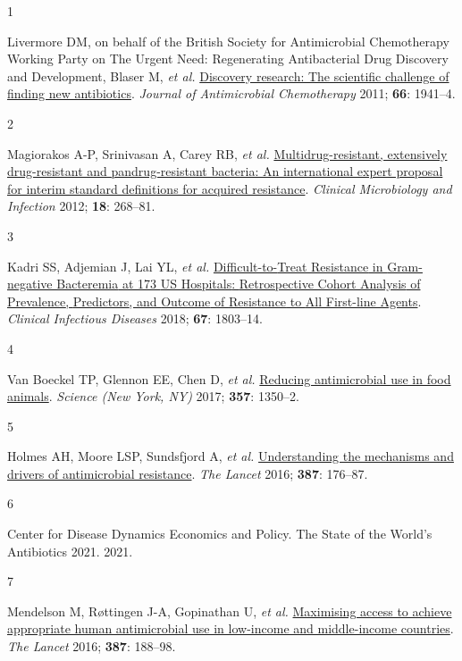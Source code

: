 \documentclass[
]{book}
\newlength{\cslhangindent}
\newlength{\csllabelwidth}
\newlength{\cslentryspacingunit} %
\newenvironment{CSLReferences}[2] %
 {%
  \setlength{\parindent}{0pt}
  \ifodd #1
  \let\oldpar\par
  \def\par{\hangindent=\cslhangindent\oldpar}
  \fi
  \setlength{\parskip}{#2\cslentryspacingunit}
 }%
 {}
\newcommand{\CSLLeftMargin}[1]{\parbox[t]{\csllabelwidth}{#1}}
\newcommand{\CSLRightInline}[1]{\parbox[t]{\linewidth - \csllabelwidth}{#1}\break}
\begin{document}
\hypertarget{refs}{}
\begin{CSLReferences}{0}{0}
\leavevmode{}%
\CSLLeftMargin{1 }
\CSLRightInline{Livermore DM, on behalf of the British Society for Antimicrobial Chemotherapy Working Party on The Urgent Need: Regenerating Antibacterial Drug Discovery and Development, Blaser M, \emph{et al.} \href{https://doi.org/10.1093/jac/dkr262}{Discovery research: The scientific challenge of finding new antibiotics}. \emph{Journal of Antimicrobial Chemotherapy} 2011; \textbf{66}: 1941--4.}

\leavevmode{}%
\CSLLeftMargin{2 }
\CSLRightInline{Magiorakos A-P, Srinivasan A, Carey RB, \emph{et al.} \href{https://doi.org/10.1111/j.1469-0691.2011.03570.x}{Multidrug-resistant, extensively drug-resistant and pandrug-resistant bacteria: An international expert proposal for interim standard definitions for acquired resistance}. \emph{Clinical Microbiology and Infection} 2012; \textbf{18}: 268--81.}

\leavevmode{}%
\CSLLeftMargin{3 }
\CSLRightInline{Kadri SS, Adjemian J, Lai YL, \emph{et al.} \href{https://doi.org/10.1093/cid/ciy378}{Difficult-to-{Treat Resistance} in {Gram-negative Bacteremia} at 173 {US Hospitals}: {Retrospective Cohort Analysis} of {Prevalence}, {Predictors}, and {Outcome} of {Resistance} to {All First-line Agents}}. \emph{Clinical Infectious Diseases} 2018; \textbf{67}: 1803--14.}

\leavevmode{}%
\CSLLeftMargin{4 }
\CSLRightInline{Van Boeckel TP, Glennon EE, Chen D, \emph{et al.} \href{https://doi.org/10.1126/science.aao1495}{Reducing antimicrobial use in food animals}. \emph{Science (New York, NY)} 2017; \textbf{357}: 1350--2.}

\leavevmode{}%
\CSLLeftMargin{5 }
\CSLRightInline{Holmes AH, Moore LSP, Sundsfjord A, \emph{et al.} \href{https://doi.org/10.1016/S0140-6736(15)00473-0}{Understanding the mechanisms and drivers of antimicrobial resistance}. \emph{The Lancet} 2016; \textbf{387}: 176--87.}

\leavevmode{}%
\CSLLeftMargin{6 }
\CSLRightInline{Center for Disease Dynamics Economics and Policy. The {State} of the {World}'s {Antibiotics} 2021. 2021.}

\leavevmode{}%
\CSLLeftMargin{7 }
\CSLRightInline{Mendelson M, Røttingen J-A, Gopinathan U, \emph{et al.} \href{https://doi.org/10.1016/S0140-6736(15)00547-4}{Maximising access to achieve appropriate human antimicrobial use in low-income and middle-income countries}. \emph{The Lancet} 2016; \textbf{387}: 188--98.}


\end{CSLReferences}
\end{document}
